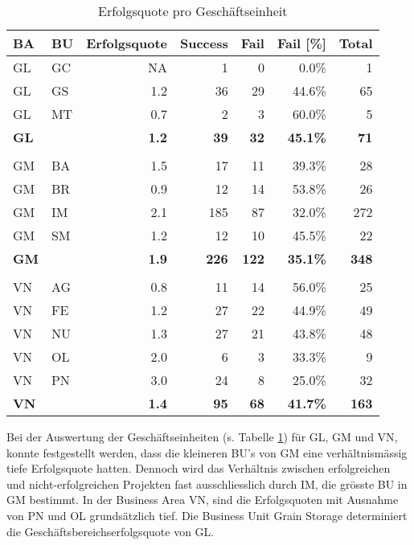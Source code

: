 \begin{table}[H]
	\centering
	\caption{Erfolgsquote pro Geschäftseinheit}
	\begin{tabular}{llrrrrr}
		\textbf{BA} & \textbf{BU} & \multicolumn{1}{l}{\textbf{Erfolgsquote}} & \multicolumn{1}{l}{\textbf{Success}} & \multicolumn{1}{l}{\textbf{Fail}} & \multicolumn{1}{l}{\textbf{Fail [\%]}} & \multicolumn{1}{l}{\textbf{Total}} \\\hline
		GL    & GC    & NA    & 1     & 0     & 0.0\% & 1 \\
		GL    & GS    & 1.2   & 36    & 29    & 44.6\% & 65 \\
		GL    & MT    & 0.7   & 2     & 3     & 60.0\% & 5 \\\hline
		\textbf{GL} &  & \textbf{1.2} & \textbf{39} &\textbf{32} & \textbf{45.1\%} & \textbf{71}\\
		      &       &       &       &       &        &   \\
		GM    & BA    & 1.5   & 17    & 11    & 39.3\% & 28 \\
		GM    & BR    & 0.9   & 12    & 14    & 53.8\% & 26 \\
		GM    & IM    & 2.1   & 185   & 87    & 32.0\% & 272 \\
		GM    & SM    & 1.2   & 12    & 10    & 45.5\% & 22 \\\hline
		\textbf{GM} &  & \textbf{1.9} & \textbf{226} &\textbf{122} & \textbf{35.1\%} & \textbf{348}\\
		      &       &       &       &       &        &   \\
		VN    & AG    & 0.8   & 11    & 14    & 56.0\% & 25 \\
		VN    & FE    & 1.2   & 27    & 22    & 44.9\% & 49 \\
		VN    & NU    & 1.3   & 27    & 21    & 43.8\% & 48 \\
		VN    & OL    & 2.0   & 6     & 3     & 33.3\% & 9 \\
		VN    & PN    & 3.0   & 24    & 8     & 25.0\% & 32 \\\hline
		\textbf{VN} &  & \textbf{1.4} & \textbf{95} &\textbf{68} & \textbf{41.7\%} & \textbf{163}\\
	\end{tabular}%
	\label{fbabu}%
\end{table}%
Bei der Auswertung der Geschäftseinheiten (s. Tabelle \ref{fbabu}) für GL, GM und VN, konnte festgestellt werden, dass die kleineren BU's von GM eine verhältnismässig tiefe Erfolgsquote hatten. Dennoch wird das Verhältnis zwischen erfolgreichen und nicht-erfolgreichen Projekten fast ausschliesslich durch IM, die grösste BU in GM bestimmt. In der Business Area VN, sind die Erfolgsquoten mit Ausnahme von PN und OL grundsätzlich tief. Die Business Unit Grain Storage determiniert die Geschäftsbereichserfolgsquote von GL.
